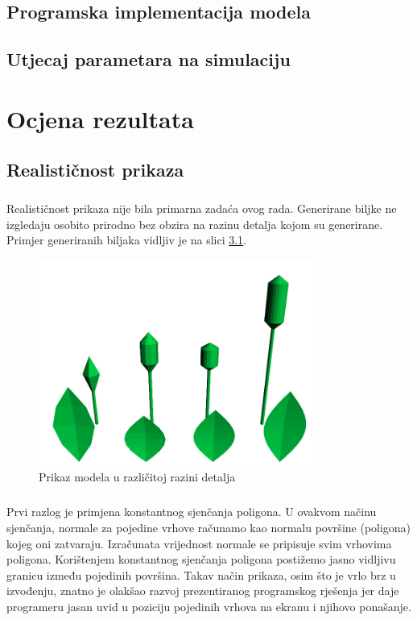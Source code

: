 \documentclass[times, utf8, diplomski]{fer}
\begin{document}
\section{Programska implementacija modela}

\section{Utjecaj parametara na simulaciju}

\chapter{Ocjena rezultata}
\section{Realističnost prikaza}
\paragraph{}
Realističnost prikaza nije bila primarna zadaća ovog rada. Generirane biljke ne 
izgledaju osobito prirodno bez obzira na razinu detalja kojom su generirane. Primjer generiranih biljaka vidljiv je na slici \ref{fig:51-1}.
\begin{figure}[h]
	\centering
	\includegraphics[width=0.8\textwidth]{img/51-1}
	\caption{Prikaz modela u različitoj razini detalja}
	\label{fig:51-1}
\end{figure}
\paragraph{}
Prvi razlog je primjena konstantnog sjenčanja poligona. U ovakvom načinu 
sjenčanja, normale za pojedine vrhove računamo kao normalu površine (poligona)
kojeg oni zatvaraju. Izračunata vrijednost normale se pripisuje svim vrhovima
poligona. Korištenjem konstantnog sjenčanja poligona postižemo jasno 
vidljivu granicu između pojedinih površina. Takav način prikaza, osim što je
vrlo brz u izvođenju, znatno je olakšao razvoj prezentiranog programskog 
rješenja jer daje programeru jasan uvid u poziciju pojedinih vrhova na ekranu
i njihovo ponašanje. 
\end{document}
